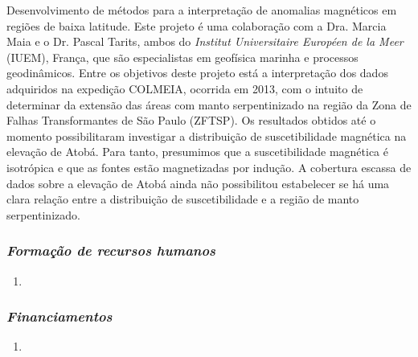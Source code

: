 Desenvolvimento de métodos para a interpretação de anomalias magnéticos em regiões de 
baixa latitude. Este projeto é uma colaboração com a Dra. Marcia Maia e o Dr. Pascal 
Tarits, ambos do \textit{Institut Universitaire Européen de la Meer} (IUEM), França, 
que são especialistas em geofísica marinha e processos geodinâmicos. 
Entre os objetivos deste projeto está a interpretação dos dados adquiridos na expedição
COLMEIA, ocorrida em 2013, com o intuito de determinar da extensão das áreas com manto 
serpentinizado na região da Zona de Falhas Transformantes de São Paulo (ZFTSP). 
Os resultados obtidos até o momento possibilitaram investigar a distribuição de 
suscetibilidade magnética na elevação de Atobá. Para tanto, presumimos que a 
suscetibilidade magnética é isotrópica e que as fontes estão magnetizadas por indução.
A cobertura escassa de dados sobre a elevação de Atobá ainda não possibilitou 
estabelecer se há uma clara relação entre a distribuição de suscetibilidade e a 
região de manto serpentinizado. 



\subsubsection{\emph{Formação de recursos humanos}}

\begin{enumerate}
	
	\item{}
	
\end{enumerate}

\subsubsection{\emph{Financiamentos}}

\begin{enumerate}
	
	\item{}
	
\end{enumerate}



